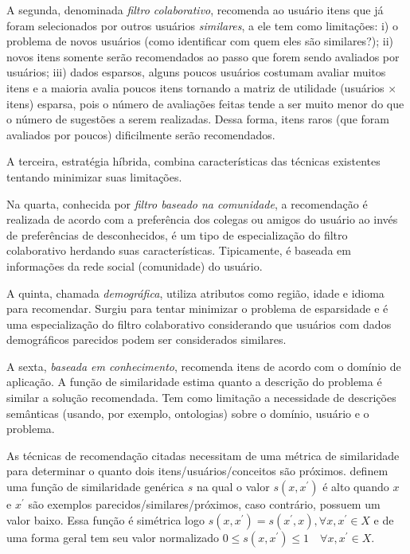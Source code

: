 A segunda, denominada \emph{filtro colaborativo}, recomenda ao usuário itens que já foram selecionados por outros usuários \emph{similares}, a ele tem como limitações: i) o problema de novos usuários (como identificar com quem eles são similares?); ii) novos itens somente serão recomendados ao passo que forem sendo avaliados por usuários; iii) dados esparsos, alguns poucos usuários costumam avaliar muitos itens e a maioria avalia poucos itens tornando a matriz de utilidade (usuários \(\times\) itens) esparsa, pois o número de avaliações feitas tende a ser muito menor do que o número de sugestões a serem realizadas. Dessa forma, itens raros (que foram avaliados por poucos) dificilmente serão recomendados.

A terceira, estratégia híbrida, combina características das técnicas existentes tentando minimizar suas limitações.

Na quarta, conhecida por \emph{filtro baseado na comunidade}, a recomendação é realizada de acordo com a preferência dos colegas ou amigos do usuário ao invés de preferências de desconhecidos, é um tipo de especialização do filtro colaborativo herdando suas características. Tipicamente, é baseada em informações da rede social (comunidade) do usuário.

A quinta, chamada \emph{demográfica}, utiliza atributos como região, idade e idioma para recomendar. Surgiu para tentar minimizar o problema de esparsidade e é uma especialização do filtro colaborativo considerando que usuários com dados demográficos parecidos podem ser considerados similares.

A sexta, \emph{baseada em conhecimento}, recomenda itens de acordo com o domínio de aplicação. A função de similaridade estima quanto a descrição do problema é similar a solução recomendada. Tem como limitação a necessidade de descrições semânticas (usando, por exemplo, ontologias) sobre o domínio, usuário e o problema.

As técnicas de recomendação citadas necessitam de uma métrica de similaridade para determinar o quanto dois itens/usuários/conceitos são próximos.  definem uma função de similaridade genérica \(s\) na qual o valor \(s(x,x^{'})\) é alto quando \(x\) e \(x^{'}\) são exemplos parecidos/similares/próximos, caso contrário, possuem um valor baixo. Essa função é simétrica logo \(s(x,x^{'}) = s(x^{'},x), \forall x,x^{'} \in X\) e de uma forma geral tem seu valor normalizado \(0 \leq s(x,x^{'}) \leq 1 \quad \forall x,x^{'} \in X\).

